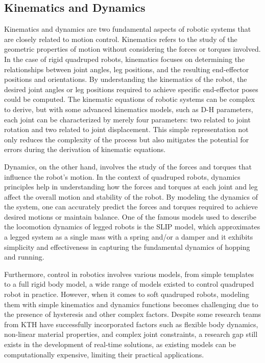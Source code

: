 \subsection{Kinematics and Dynamics}
Kinematics and dynamics are two fundamental aspects of robotic systems that are closely related to motion control. Kinematics refers to the study of the geometric properties of motion without considering the forces or torques involved. In the case of rigid quadruped robots, kinematics focuses on determining the relationships between joint angles, leg positions, and the resulting end-effector positions and orientations. By understanding the kinematics of the robot, the desired joint angles or leg positions required to achieve specific end-effector poses could be computed. The kinematic equations of robotic systems can be complex to derive, but with some advanced kinematics models, such as \ac{D-H} parameters\cite{denavitKinematicNotationLowerPair1955}, each joint can be characterized by merely four parameters: two related to joint rotation and two related to joint displacement. This simple representation not only reduces the complexity of the process but also mitigates the potential for errors during the derivation of kinematic equations.

Dynamics, on the other hand, involves the study of the forces and torques that influence the robot's motion. In the context of quadruped robots, dynamics principles help in understanding how the forces and torques at each joint and leg affect the overall motion and stability of the robot. By modeling the dynamics of the system, one can accurately predict the forces and torques required to achieve desired motions or maintain balance. One of the famous models used to describe the locomotion dynamics of legged robots is the \ac{SLIP} model\cite{poulakakisSpringLoadedInverted2009}, which approximates a legged system as a single mass with a spring and/or a damper and it exhibits simplicity and effectiveness in capturing the fundamental dynamics of hopping and running.

Furthermore, control in robotics involves various models, from simple templates to a full rigid body model, a wide range of models existed to control quadruped robot in practice\cite{hwangboSimulationRealWorld2018}. However, when it comes to soft quadruped robots, modeling them with simple kinematics and dynamics functions becomes challenging due to the presence of hysteresis and other complex factors. Despite some research teams from KTH\cite{daneliaStructureGaitOptimizationof2021, lagreliusComparingFourModelling2022} have successfully incorporated factors such as flexible body dynamics, non-linear material properties, and complex joint constraints, a research gap still exists in the development of real-time solutions, as existing models can be computationally expensive, limiting their practical applications.

